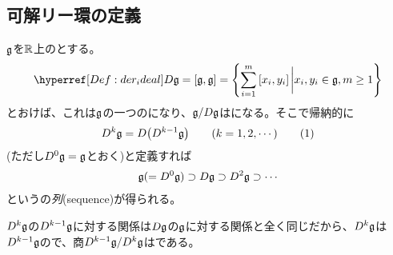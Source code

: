 \documentclass[../main]{subfiles}
\begin{document}
\subsection{可解リー環の定義}
\begin{definition}[列]\label{Def:sequence}
  $\mathfrak{g}$を{}$\mathbb{R}$上の{}とする。
  \begin{align*}
    \href{Def:der_ideal}{D\g}=\comm{\g}{\g}=\qty{\sum_{i=1}^{m}\comm{x_{i}}{y_{i}}\eval x_{i},y_{i}\in\g, m\ge1}
  \end{align*}
  とおけば、これは$\mathfrak{g}$の一つの{}になり、{}$\mathfrak{g}/D\mathfrak{g}$は{}になる。そこで帰納的に
  \begin{align*}
    D^{k}\g=D\qty(D^{k-1}\g)\qq{}(k=1,2,\cdots)
    \tag{1}\label{eq:3_(1)}
  \end{align*}
  (ただし$D^{0}\mathfrak{g}=\mathfrak{g}$とおく)と定義すれば
  \begin{align*}
    \mathfrak{g}(=D^{0}\mathfrak{g})\supset D\mathfrak{g} \supset D^{2}\mathfrak{g} \supset \cdots
  \end{align*}
  という{}の\emph{列}(sequence)が得られる。
\end{definition}

\begin{remark}
  $D^{k}\mathfrak{g}$の$D^{k-1}\mathfrak{g}$に対する関係は$D\mathfrak{g}$の$\mathfrak{g}$に対する関係と全く同じだから、$D^{k}\mathfrak{g}$は$D^{k-1}\mathfrak{g}$の{}で、商$D^{k-1}\mathfrak{g}/D^{k}\mathfrak{g}$は{}である。
\end{remark}
\end{document}
